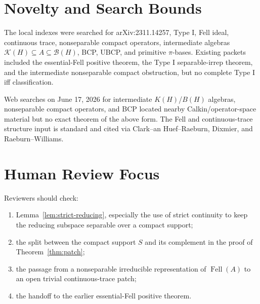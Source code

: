 \documentclass[11pt]{article}
\newcommand{\Kcal}{\mathcal K}
\newcommand{\Bcal}{\mathcal B}
\newcommand{\Fell}{\operatorname{Fell}}
\begin{document}
\section*{Novelty and Search Bounds}

The local indexes were searched for arXiv:2311.14257, Type I, Fell ideal,
continuous trace, nonseparable compact operators, intermediate algebras
\(\Kcal(H)\subseteq A\subseteq\Bcal(H)\), BCP, UBCP, and primitive
\(\pi\)-bases.  Existing packets included the essential-Fell positive theorem,
the Type I separable-irrep theorem, and the intermediate nonseparable compact
obstruction, but no complete Type I iff classification.

Web searches on June 17, 2026 for intermediate \(K(H)\)/\(B(H)\) algebras,
nonseparable compact operators, and BCP located nearby Calkin/operator-space
material but no exact theorem of the above form.  The Fell and
continuous-trace structure input is standard and cited via Clark--an
Huef--Raeburn, Dixmier, and Raeburn--Williams.

\section*{Human Review Focus}

Reviewers should check:
\begin{enumerate}
    \item Lemma~\ref{lem:strict-reducing}, especially the use of strict
          continuity to keep the reducing subspace separable over a compact
          support;
    \item the split between the compact support \(S\) and its complement in
          the proof of Theorem~\ref{thm:patch};
    \item the passage from a nonseparable irreducible representation of
          \(\Fell(A)\) to an open trivial continuous-trace patch;
    \item the handoff to the earlier essential-Fell positive theorem.
\end{enumerate}
\end{document}
